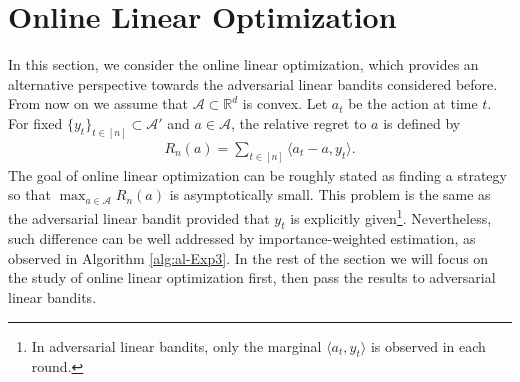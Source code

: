 \documentclass[letterpaper,11pt,openright,openany]{book}
\numberwithin{equation}{section}
\theoremstyle{plain}
\theoremstyle{definition}
\def\R{{\mathbb R}}
\def\R{{\mathbb R}}
\begin{document}
\section{Online Linear Optimization}

In this section, we consider the online linear optimization, which provides an alternative perspective towards the adversarial linear bandits considered before. 
From now on we assume that $\mathcal A\subset\R^d$ is convex. 
Let $a_t$ be the action at time $t$. For fixed $\{y_t\}_{t\in [n]}\subset \mathcal A'$ and $a\in\mathcal A$, the relative regret to $a$ is defined by 
\begin{align*}
R_n(a) = \sum_{t\in [n]}\langle a_t-a, y_t\rangle. 
\end{align*}
The goal of online linear optimization can be roughly stated as finding a strategy so that $\max_{a\in\mathcal A}R_n(a)$ is asymptotically small. This problem is the same as the adversarial linear bandit provided that $y_t$ is explicitly given\footnote{In adversarial linear bandits, only the marginal $\langle a_t, y_t\rangle$ is observed in each round.}. 
Nevertheless, such difference can be well addressed by importance-weighted estimation, as observed in Algorithm \ref{alg:al-Exp3}. 
In the rest of the section we will focus on the study of online linear optimization first, then pass the results to adversarial linear bandits. 
\end{document}

